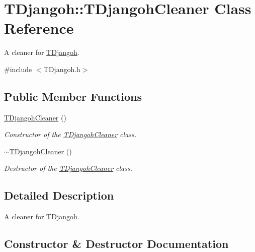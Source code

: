 \hypertarget{class_t_djangoh_1_1_t_djangoh_cleaner}{}\section{T\+Djangoh\+:\+:T\+Djangoh\+Cleaner Class Reference}
\label{class_t_djangoh_1_1_t_djangoh_cleaner}


A cleaner for \hyperlink{class_t_djangoh}{T\+Djangoh}.  




{\ttfamily \#include $<$T\+Djangoh.\+h$>$}

\subsection*{Public Member Functions}
\begin{DoxyCompactItemize}
\item 
\hyperlink{class_t_djangoh_1_1_t_djangoh_cleaner_ac730a2e29815e3dc967900c0e1eaf189}{T\+Djangoh\+Cleaner} ()
\begin{DoxyCompactList}\small\item\em Constructor of the \hyperlink{class_t_djangoh_1_1_t_djangoh_cleaner}{T\+Djangoh\+Cleaner} class. \end{DoxyCompactList}\item 
\hyperlink{class_t_djangoh_1_1_t_djangoh_cleaner_a0eee987a431011c09a263c8eaf85db5c}{$\sim$\+T\+Djangoh\+Cleaner} ()
\begin{DoxyCompactList}\small\item\em Destructor of the \hyperlink{class_t_djangoh_1_1_t_djangoh_cleaner}{T\+Djangoh\+Cleaner} class. \end{DoxyCompactList}\end{DoxyCompactItemize}


\subsection{Detailed Description}
A cleaner for \hyperlink{class_t_djangoh}{T\+Djangoh}. 

\subsection{Constructor \& Destructor Documentation}
\mbox{\label{class_t_djangoh_1_1_t_djangoh_cleaner_ac730a2e29815e3dc967900c0e1eaf189}} 
